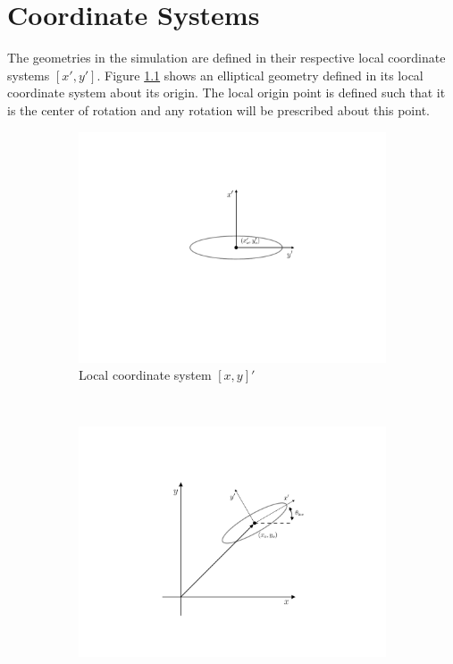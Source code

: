 \chapter{Coordinate Systems}
\label{app:coordinateSystems}
The geometries in the simulation are defined in their respective local coordinate systems $[x',y']$. Figure \ref{fig:localPosition2} shows an elliptical geometry defined in its local coordinate system about its origin. The local origin point is defined such that it is the center of rotation and any rotation will be prescribed about this point.

	\begin{figure}[h]
     \centering
     \begin{subfigure}[t]{0.45\textwidth}
             \includegraphics[trim=4.5cm 2.cm 3.5cm 1.5cm, clip, width=\linewidth]{./figures/coupling/interpolation/ellipse/localOrientation2.pdf}
             \caption{Local coordinate system $[x,y]'$}
             \label{fig:localPosition2}
     \end{subfigure}%
     ~ %
     \begin{subfigure}[t]{0.45\textwidth}
             \includegraphics[trim=4.5cm 2.cm 3.5cm 1.5cm, clip, width=\linewidth]{./figures/coupling/interpolation/ellipse/globalOrientation.pdf}

\end{subfigure}
\end{figure}
